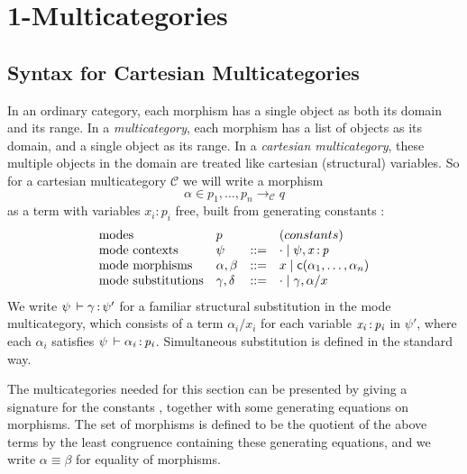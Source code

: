 
\newcommand\mor[3]{\ensuremath{#2} \longrightarrow_#1 #3}
\newcommand\C{\ensuremath{\mathcal{C}}}
\newcommand\deq{\ensuremath{\equiv}}
\newcommand\seq[3]{\ensuremath{#1 \vdash_{#2} #3}}
\newcommand\F[2]{\ensuremath{\dsd{F}_{#1}(#2)}}
\newcommand\U[3]{\ensuremath{\dsd{U}_{#1}(#2 \multimap #3)}}
\newcommand\tsubst[2]{\ensuremath{#1[#2]}}
\renewcommand\subst[3]{\ensuremath{#1[#2/#3]}}
\newcommand\wftype[2]{\ensuremath{#1 \: \dsd{type}_{#2}}}
\renewcommand\wfctx[2]{\ensuremath{#1 \: \dsd{ctx}_{#2}}}

\section{1-Multicategories}

\subsection{Syntax for Cartesian Multicategories}
In an ordinary category, each morphism has a single object as both its
domain and its range.  In a \emph{multicategory}, each morphism has a
list of objects as its domain, and a single object as its range.  In a
\emph{cartesian multicategory}, these multiple objects in the domain are
treated like cartesian (structural) variables. So for a cartesian
multicategory \C\/ we will write a morphism
\[
\alpha \in \mor{\C}{p_1,\ldots,p_n}{q}
\]
as a term with variables $x_i:p_i$ free, built from generating constants
:
\[
\begin{array}{llll}
\text{modes} & p & & (constants) \\
\text{mode contexts} & \psi & ::= & \cdot \mid \psi,\mathit{x} \, \mathit{:} \, \mathit{p} \\
\text{mode morphisms} & \alpha,\beta & ::= & x \mid \mathsf{c}(\alpha_1,\ldots,\alpha_n) \\
\text{mode substitutions} & \gamma,\delta & ::= & \cdot \mid \gamma,\alpha/x\\
\end{array}
\]
We write $\psi \, \vdash \mathit{\gamma} \, \mathit{:} \, \mathit{\psi'}$ for a familiar structural
substitution in the mode multicategory, which consists of a term
$\alpha_i/x_i$ for each variable $\mathit{x_i} \, \mathit{:} \, \mathit{p_i}$ in $\psi'$, where
each $\alpha_i$ satisfies $\psi \, \vdash \mathit{\alpha_i} \, \mathit{:} \, \mathit{p_i}$.  Simultaneous
substitution is defined in the standard way.  

The multicategories needed for this section can be presented by giving a
signature for the constants , together with some generating
equations on morphisms. The set of morphisms is defined to be the
quotient of the above terms by the least congruence containing these
generating equations, and we write $\alpha \deq \beta$ for equality of
morphisms.

